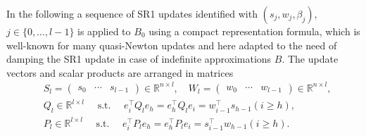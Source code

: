 \documentclass{svmult}
\begin{document}
\noindent In the following a sequence of SR1 updates identified with $(s_j,w_j,\beta_j)$, $j\in \{0,\dots, l-1\}$ is applied to $B_0$ using a compact representation formula, which is well-known for many quasi-Newton updates and here adapted to the need of damping the SR1 update in case of indefinite approximations $B$. The update vectors and scalar products are arranged in matrices
%
\begin{align*}
 	&S_l = 
 			\begin{pmatrix}
 				s_{0} &   \cdots   & s_{l-1}
 			\end{pmatrix}\in \mathbb{R}^{n\times l}, \quad
 	W_l =
			\begin{pmatrix}
 				w_{0} & \cdots  & w_{l-1}
 			\end{pmatrix}\in \mathbb{R}^{n\times l} ,\\
	&Q_l  \in \mathbb{R}^{l \times l} \quad \mbox{ s.t. } \quad e_i^\top Q_l e_h = e_h^\top Q_l e_i=w^{\top}_{i-1}s_{h-1} (i\geq h),\\
	&P_l  \in \mathbb{R}^{l \times l} \quad \mbox{ s.t. } \quad e_i ^\top P_l e_h= e_h^\top P_l e_i=s^{\top}_{i-1}w_{h-1} (i\geq h).
\end{align*}
\end{document}

